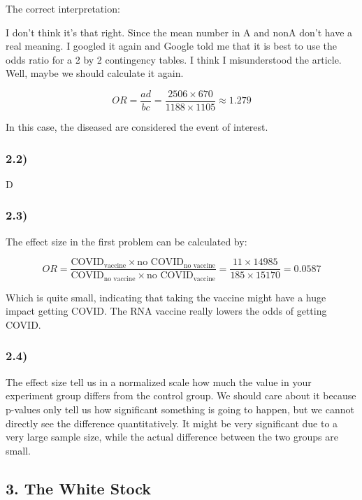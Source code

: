 \documentclass[
]{article}
\begin{document}
The correct interpretation:

I don't think it's that right. Since the mean number in A and nonA don't
have a real meaning. I googled it again and Google told me that it is
best to use the odds ratio for a 2 by 2 contingency tables. I think I
misunderstood the article. Well, maybe we should calculate it again.

\[
OR = \frac{ad}{bc} = \frac{2506 \times 670}{1188 \times 1105} \approx 1.279
\]

In this case, the diseased are considered the event of interest.

\hypertarget{section-6}{%
\subsubsection{2.2)}\label{section-6}}

D

\hypertarget{section-7}{%
\subsubsection{2.3)}\label{section-7}}

The effect size in the first problem can be calculated by:

\[
OR = \frac{\text{COVID}_\text{vaccine} \times \text{no COVID}_\text{no vaccine}}{\text{COVID}_\text{no vaccine} \times \text{no COVID}_\text{vaccine}} = \frac{11 \times 14985}{185 \times 15170} = 0.0587
\]

Which is quite small, indicating that taking the vaccine might have a
huge impact getting COVID. The RNA vaccine really lowers the odds of
getting COVID.

\hypertarget{section-8}{%
\subsubsection{2.4)}\label{section-8}}

The effect size tell us in a normalized scale how much the value in your
experiment group differs from the control group. We should care about it
because p-values only tell us how significant something is going to
happen, but we cannot directly see the difference quantitatively. It
might be very significant due to a very large sample size, while the
actual difference between the two groups are small.

\hypertarget{the-white-stock}{%
\subsection{3. The White Stock}\label{the-white-stock}}
\end{document}
